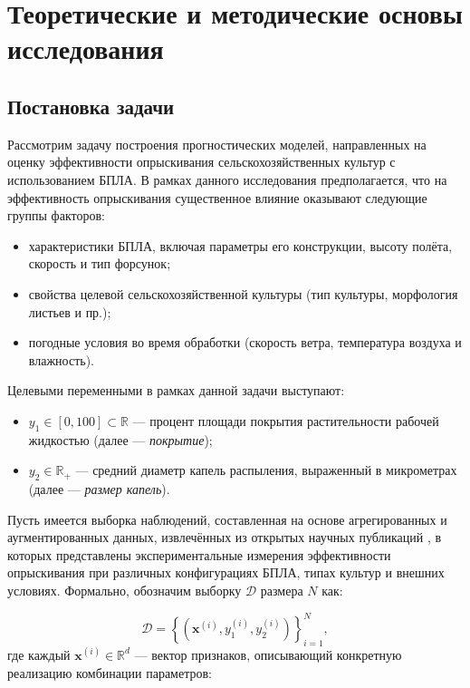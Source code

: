 \chapter{Теоретические и методические основы исследования} \label{ch1}

\section{Постановка задачи} \label{ch1:task}
Рассмотрим задачу построения прогностических моделей, направленных на оценку эффективности опрыскивания сельскохозяйственных культур с использованием БПЛА. В рамках данного исследования предполагается, что на эффективность опрыскивания существенное влияние оказывают следующие группы факторов: 
\begin{itemize}
\item характеристики БПЛА, включая параметры его конструкции, высоту полёта, скорость и тип форсунок; 
\item свойства целевой сельскохозяйственной культуры (тип культуры, морфология листьев и пр.); 
\item погодные условия во время обработки (скорость ветра, температура воздуха и влажность).
\end{itemize}

Целевыми переменными в рамках данной задачи выступают:
\begin{itemize}
\item $y_1 \in [0, 100] \subset \mathbb{R}$ --- процент площади покрытия растительности рабочей жидкостью (далее --- \textit{покрытие});
\item $y_2 \in \mathbb{R}_{+}$ --- средний диаметр капель распыления, выраженный в микрометрах (далее --- \textit{размер капель}).
\end{itemize}

Пусть имеется выборка наблюдений, составленная на основе агрегированных и аугментированных данных, извлечённых из открытых научных публикаций \cite{UAVOP, FlightMode}, в которых представлены экспериментальные измерения эффективности опрыскивания при различных конфигурациях БПЛА, типах культур и внешних условиях. Формально, обозначим выборку $\mathcal{D}$ размера $N$ как:

\begin{equation}
	\mathcal{D} = \left\{ \left(\mathbf{x}^{(i)}, y_1^{(i)}, y_2^{(i)}\right) \right\}_{i=1}^{N},
\end{equation}
где каждый $\mathbf{x}^{(i)} \in \mathbb{R}^d$ --- вектор признаков, описывающий конкретную реализацию комбинации параметров:

